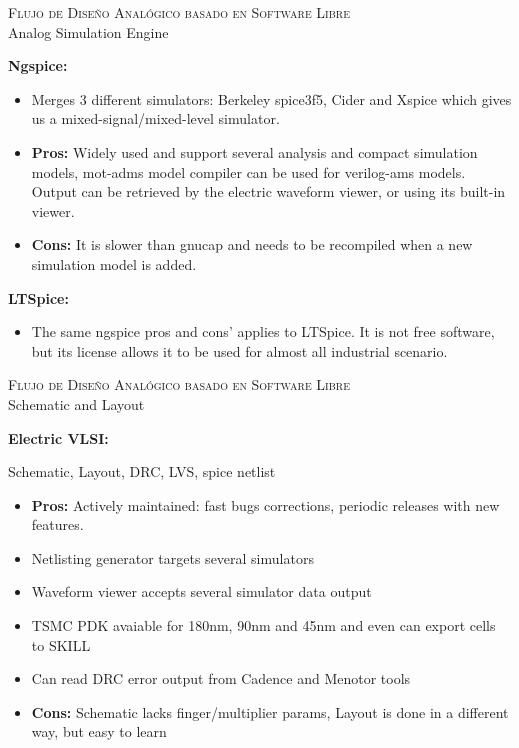 \documentclass[ps,clariphy]{prosper}
\begin{document}
\newline 
\begin{slide}{ \textsc{{\tiny Flujo de Dise\~no Anal\'ogico basado en Software Libre}}\\ Analog Simulation Engine}
\tiny{
    \textbf{Ngspice:}
	\begin{itemize}
      	\item Merges 3 different simulators: Berkeley spice3f5, Cider and Xspice which gives us a mixed-signal/mixed-level simulator.
      	\item \textbf{ Pros:} Widely used and support several analysis and compact simulation models, mot-adms model compiler can be used for verilog-ams models. Output can be
retrieved by the electric waveform viewer, or using its built-in viewer.
      	\item \textbf{Cons:} It is slower than gnucap and needs to be recompiled when a new simulation model is added.
    \end{itemize}
  
    \textbf{LTSpice:}
	\begin{itemize}
      	\item The same ngspice pros and cons' applies to LTSpice. It is not free software, but its license allows it to be used for almost all industrial scenario.
    \end{itemize}
  }
\end{slide}

\begin{slide}{ \textsc{{\tiny Flujo de Dise\~no Anal\'ogico basado en Software Libre}}\\ Schematic and Layout}
  \vspace{-0.5cm}
  \tiny{
    \textbf{Electric VLSI:}
    
      	\newline Schematic, Layout, DRC, LVS, spice netlist
\begin{itemize}
      	\item \textbf{Pros:} Actively maintained: fast bugs corrections, periodic releases with new features. 
      	\item Netlisting generator targets several simulators
      	\item Waveform viewer accepts several simulator data output
      	\item TSMC PDK avaiable for 180nm, 90nm and 45nm and even can export cells to SKILL 
	\item Can read DRC error output from Cadence and Menotor tools
	 
      	\item \textbf{Cons:} Schematic lacks finger/multiplier params, Layout is done in a different way, but easy to learn
\end{itemize}
  }
\end{slide}
\end{document}
